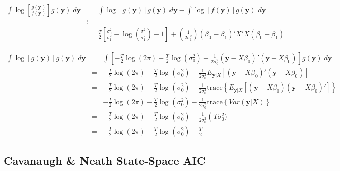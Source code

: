 \documentclass[12pt]{article}
\theoremstyle{definition}
\begin{document}
\begin{eqnarray*}
	\int \log\left[\frac{g(\mathbf{y})}{f(\mathbf{y})} \right]g(\mathbf{y}) \;d\mathbf{y}  &=& \int \log[g(\mathbf{y})] g(\mathbf{y}) \; d \mathbf{y} - \int \log[f(\mathbf{y})]g(\mathbf{y}) \; d \mathbf{y}\\
	 &\vdots& \\
	 &=& \frac{T}{2}\left[\frac{\sigma_0^2}{\sigma_1^2} - \log\left(\frac{\sigma_0^2}{\sigma_1^2}\right) - 1 \right] + \left(\frac{1}{2 \sigma_1^2}\right)\left(\beta_0 - \beta_1\right)'X'X\left(\beta_0 - \beta_1\right)
\end{eqnarray*}



\begin{eqnarray*}
	\int \log[g(\mathbf{y})] g(\mathbf{y}) \; d \mathbf{y} &=& \int \left[-\frac{T}{2}\log(2\pi) -\frac{T}{2} \log(\sigma^2_0) - \frac{1}{2\sigma_0^2}\left(\textbf{y} - X\beta_0\right)'\left(\textbf{y} -X\beta_0\right) \right] g(\mathbf{y})\; d\mathbf{y}\\
	&=& -\frac{T}{2}\log(2\pi) -\frac{T}{2} \log(\sigma^2_0) -  \frac{1}{2\sigma_0^2} E_{\mathbf{y}|X}\left[\left(\textbf{y} - X\beta_0\right)'\left(\textbf{y} -X\beta_0\right)\right]\\
	&=& -\frac{T}{2}\log(2\pi) -\frac{T}{2} \log(\sigma^2_0) -  \frac{1}{2\sigma_0^2}\mbox{trace}\left\{ E_{\mathbf{y}|X}\left[\left(\textbf{y} - X\beta_0\right)\left(\textbf{y} -X\beta_0\right)'\right]\right\}\\
	&=& -\frac{T}{2}\log(2\pi) -\frac{T}{2} \log(\sigma^2_0) -  \frac{1}{2\sigma_0^2}\mbox{trace}\left\{ Var(\mathbf{y}|X)\right\}\\
	&=& -\frac{T}{2}\log(2\pi) -\frac{T}{2} \log(\sigma^2_0) -  \frac{1}{2\sigma_0^2}\left(T \sigma_0^2)\\
	&=& -\frac{T}{2}\log(2\pi) -\frac{T}{2} \log(\sigma^2_0) -  \frac{T}{2}
\end{eqnarray*}
\subsection{Cavanaugh \& Neath State-Space AIC}
\end{document}
